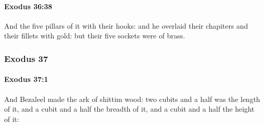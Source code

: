 		\paragraph{Exodus 36:38} %
			\label{EXODUS-36-38}

			And the five pillars of it with their hooks: and he overlaid their chapiters and their fillets with gold: but their five sockets were of brass.

	\subsubsection{Exodus 37} %
		\label{EXODUS-37}

		\paragraph{Exodus 37:1} %
			\label{EXODUS-37-1}

			And Bezaleel made the ark of shittim wood: two cubits and a half was the length of it, and a cubit and a half the breadth of it, and a cubit and a half the height of it:

